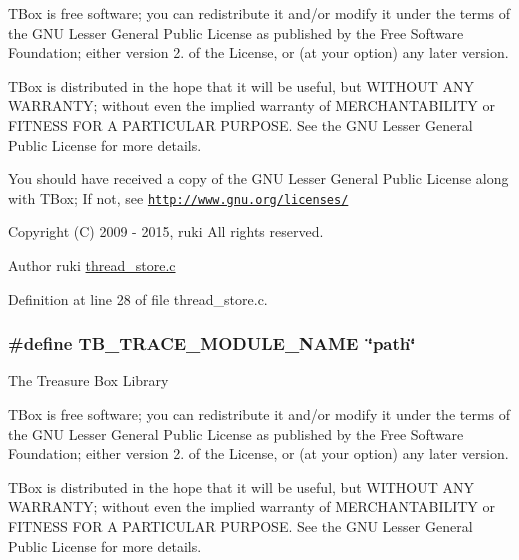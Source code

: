 T\-Box is free software; you can redistribute it and/or modify it under the terms of the G\-N\-U Lesser General Public License as published by the Free Software Foundation; either version 2. of the License, or (at your option) any later version.

T\-Box is distributed in the hope that it will be useful, but W\-I\-T\-H\-O\-U\-T A\-N\-Y W\-A\-R\-R\-A\-N\-T\-Y; without even the implied warranty of M\-E\-R\-C\-H\-A\-N\-T\-A\-B\-I\-L\-I\-T\-Y or F\-I\-T\-N\-E\-S\-S F\-O\-R A P\-A\-R\-T\-I\-C\-U\-L\-A\-R P\-U\-R\-P\-O\-S\-E. See the G\-N\-U Lesser General Public License for more details.

You should have received a copy of the G\-N\-U Lesser General Public License along with T\-Box; If not, see \href{http://www.gnu.org/licenses/}{\tt http\-://www.\-gnu.\-org/licenses/}

Copyright (C) 2009 -\/ 2015, ruki All rights reserved.

\begin{DoxyAuthor}{Author}
ruki  \hyperlink{thread__store_8c_source}{thread\-\_\-store.\-c} 
\end{DoxyAuthor}


Definition at line 28 of file thread\-\_\-store.\-c.

\hypertarget{group__platform_ga2aa61763aba311653f75dfdea928da4e}{
\subsubsection[{T\-B\-\_\-\-T\-R\-A\-C\-E\-\_\-\-M\-O\-D\-U\-L\-E\-\_\-\-N\-A\-M\-E}]{\setlength{\rightskip}{0pt plus 5cm}\#define T\-B\-\_\-\-T\-R\-A\-C\-E\-\_\-\-M\-O\-D\-U\-L\-E\-\_\-\-N\-A\-M\-E~\char`\"{}path\char`\"{}}}\label{group__platform_ga2aa61763aba311653f75dfdea928da4e}
The Treasure Box Library

T\-Box is free software; you can redistribute it and/or modify it under the terms of the G\-N\-U Lesser General Public License as published by the Free Software Foundation; either version 2. of the License, or (at your option) any later version.

T\-Box is distributed in the hope that it will be useful, but W\-I\-T\-H\-O\-U\-T A\-N\-Y W\-A\-R\-R\-A\-N\-T\-Y; without even the implied warranty of M\-E\-R\-C\-H\-A\-N\-T\-A\-B\-I\-L\-I\-T\-Y or F\-I\-T\-N\-E\-S\-S F\-O\-R A P\-A\-R\-T\-I\-C\-U\-L\-A\-R P\-U\-R\-P\-O\-S\-E. See the G\-N\-U Lesser General Public License for more details.

